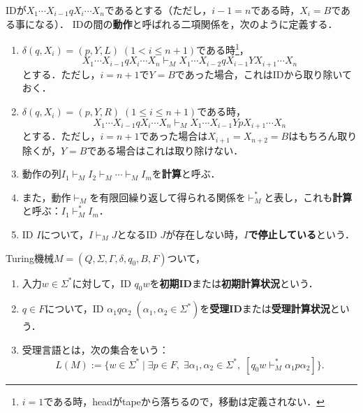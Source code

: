 \documentclass[uplatex, dvipdfmx]{jsreport}
\begin{document}
\begin{definition}
    IDが$X_1\cdots X_{i-1}qX_{i}\cdots X_n$であるとする（ただし，$i-1=n$である時，$X_i=B$である事になる）．
    IDの間の\textbf{動作}と呼ばれる二項関係を，次のように定義する．
    \begin{enumerate}
        \item $\delta(q,X_i)=(p,Y,L)\;(1<i\le n+1)$である時\footnote{$i=1$である時，headがtapeから落ちるので，移動は定義されない．}，
        \[X_1\cdots X_{i-1}qX_i\cdots X_n\vdash_MX_1\cdots X_{i-2}qX_{i-1}YX_{i+1}\cdots X_n\]
        とする．ただし，$i=n+1$で$Y=B$であった場合，これはIDから取り除いておく．
        \item $\delta(q,X_i)=(p,Y,R)\;(1\le i\le n+1)$である時，
        \[X_1\cdots X_{i-1}qX_i\cdots X_n\vdash_MX_1\cdots X_{i-1}YpX_{i+1}\cdots X_n\]
        とする．ただし，$i=n+1$であった場合は$X_{i+1}=X_{n+2}=B$はもちろん取り除くが，$Y=B$である場合はこれは取り除けない．
        \item 動作の列$I_1\vdash_MI_2\vdash_M\cdots\vdash_MI_m$を\textbf{計算}と呼ぶ．
        \item また，動作$\vdash_M$を有限回繰り返して得られる関係を$\vdash_M^*$と表し，これも\textbf{計算}と呼ぶ：$I_1\vdash^*_MI_m$．
        \item ID $I$について，$I\vdash_MJ$となるID $J$が存在しない時，\textbf{$I$で停止している}という．
    \end{enumerate}
\end{definition}

\begin{definition}
    Turing機械$M=(Q,\Sigma,\Gamma,\delta,q_0,B,F)$ついて，
    \begin{enumerate}
        \item 入力$w\in\Sigma^*$に対して，ID $q_0w$を\textbf{初期ID}または\textbf{初期計算状況}という．
        \item $q\in F$について，ID $\alpha_1q\alpha_2\;(\alpha_1,\alpha_2\in\Sigma^*)$を\textbf{受理ID}または\textbf{受理計算状況}という．
        \item 受理言語とは，次の集合をいう：\[L(M):=\{w\in\Sigma^*\mid \exists p\in F,\;\exists\alpha_1,\alpha_2\in\Sigma^*,\;[q_0w\vdash^*_M\alpha_1p\alpha_2]\}.\]
    \end{enumerate}
\end{definition}
\end{document}

